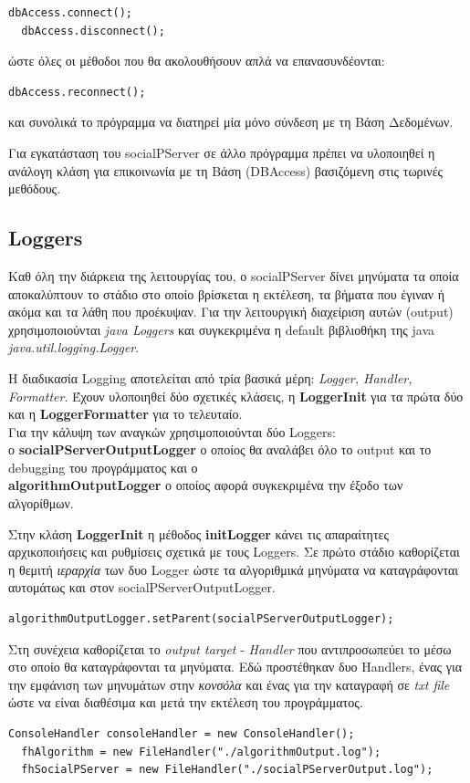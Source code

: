 \begin{lstlisting}[frame=single]
  dbAccess.connect();
  dbAccess.disconnect();
\end{lstlisting}          
ώστε όλες οι μέθοδοι που θα ακολουθήσουν απλά να επανασυνδέονται:
\begin{lstlisting}[frame=single]
  dbAccess.reconnect();
\end{lstlisting}
και συνολικά το πρόγραμμα να διατηρεί μία μόνο σύνδεση με τη Βάση Δεδομένων.  


Για εγκατάσταση του socialPServer σε άλλο πρόγραμμα πρέπει να υλοποιηθεί η ανάλογη κλάση για επικοινωνία με τη Βάση (DBAccess)
  βασιζόμενη στις τωρινές μεθόδους.


\subsection{Loggers}
\label{Loggers}
\noindent
Καθ όλη την διάρκεια της λειτουργίας του, ο socialPServer δίνει μηνύματα τα οποία αποκαλύπτουν το στάδιο στο οποίο βρίσκεται η εκτέλεση,
τα βήματα που έγιναν ή ακόμα και τα λάθη που προέκυψαν.
Για την λειτουργική διαχείριση αυτών (output) χρησιμοποιούνται \emph{java Loggers} και συγκεκριμένα η default βιβλιοθήκη της java \emph{java.util.logging.Logger}.

Η διαδικασία Logging αποτελείται από τρία βασικά μέρη: \emph{Logger, Handler, Formatter}.
Έχουν υλοποιηθεί δύο σχετικές κλάσεις, η \textbf{LoggerInit} για τα πρώτα δύο και η \textbf{LoggerFormatter} για το τελευταίο.\\

Για την κάλυψη των αναγκών χρησιμοποιούνται δύο Loggers:\\
ο \textbf{socialPServerOutputLogger} ο οποίος θα αναλάβει όλο το output και το debugging του προγράμματος και ο\\
\textbf{algorithmOutputLogger} ο οποίος αφορά συγκεκριμένα την έξοδο των αλγορίθμων.

Στην κλάση \textbf{LoggerInit} η μέθοδος \textbf{initLogger} κάνει τις απαραίτητες αρχικοποιήσεις και ρυθμίσεις σχετικά με τους Loggers.
Σε πρώτο στάδιο καθορίζεται η θεμιτή \emph{ιεραρχία} των δυο Logger ώστε τα αλγοριθμικά μηνύματα να καταγράφονται αυτομάτως και στον socialPServerOutputLogger. 
\begin{lstlisting}[frame=single] 
  algorithmOutputLogger.setParent(socialPServerOutputLogger);
\end{lstlisting}

        
Στη συνέχεια καθορίζεται το \emph{output target} - \emph{Handler} που αντιπροσωπεύει το μέσω στο οποίο θα καταγράφονται τα μηνύματα. Εδώ προστέθηκαν δυο Handlers,
ένας για την εμφάνιση των μηνυμάτων στην \emph{κονσόλα} και ένας για την καταγραφή σε \emph{txt file} ώστε να είναι διαθέσιμα και μετά την εκτέλεση του προγράμματος.
\begin{lstlisting}[frame=single] 
  ConsoleHandler consoleHandler = new ConsoleHandler();
  fhAlgorithm = new FileHandler("./algorithmOutput.log");
  fhSocialPServer = new FileHandler("./socialPServerOutput.log");
\end{lstlisting}
  
